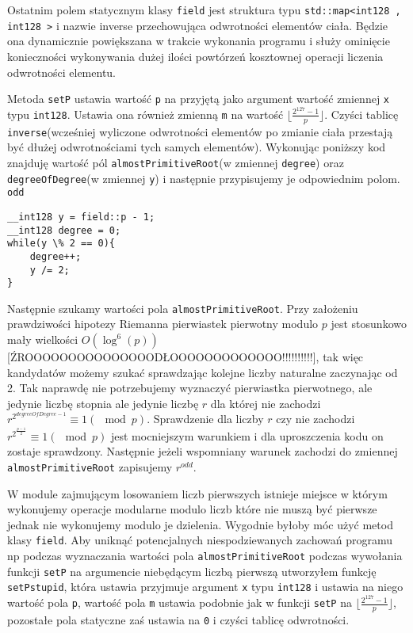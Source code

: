 \documentclass{article}
\begin{document}
Ostatnim polem statycznym klasy \texttt{field} jest struktura typu 
\texttt{std::map<\textunderscore \textunderscore int128 , \textunderscore \textunderscore int128 >} i nazwie 
inverse przechowująca odwrotności elementów ciała. Będzie ona dynamicznie powiększana w trakcie wykonania 
programu i służy ominięcie konieczności wykonywania dużej ilości powtórzeń kosztownej operacji liczenia odwrotności
elementu. 



Metoda \texttt{setP} ustawia wartość
\texttt{p} na przyjętą jako argument wartość zmiennej \texttt{x} typu 
\texttt{\textunderscore \textunderscore int128}. 
Ustawia ona również zmienną \texttt{m} na wartość $\lfloor \frac{2^{127}-1}{p} \rfloor$.
Czyści tablicę \texttt{inverse}(wcześniej wyliczone odwrotności elementów
po zmianie ciała przestają być dłużej odwrotnościami tych samych elementów).
Wykonując poniższy kod znajduję wartość pól \texttt{almostPrimitiveRoot}(w zmiennej \texttt{degree}) oraz 
\texttt{degreeOfDegree}(w zmiennej \texttt{y}) i następnie przypisujemy je odpowiednim polom.
\texttt{odd}
\begin{lstlisting}
__int128 y = field::p - 1;
__int128 degree = 0;
while(y \% 2 == 0){
    degree++;
    y /= 2;
}
\end{lstlisting} 

Następnie szukamy wartości pola \texttt{almostPrimitiveRoot}. 
Przy założeniu prawdziwości hipotezy Riemanna pierwiastek pierwotny modulo $p$ jest
stosunkowo mały wielkości $O(\log^6(p))$ [ŹROOOOOOOOOOOOOOODŁOOOOOOOOOOOOO!!!!!!!!!!], 
tak więc kandydatów możemy szukać sprawdzając kolejne liczby naturalne zaczynając od 2. 
Tak naprawdę nie potrzebujemy wyznaczyć pierwiastka pierwotnego, ale jedynie liczbę stopnia ale jedynie liczbę
$r$ dla której nie zachodzi $r^{2^{degreeOfDegree-1}} \equiv 1 (\mod p)$. Sprawdzenie dla liczby $r$ czy nie zachodzi 
$r^{2^\frac{p-1}{2}} \equiv 1 (\mod p)$ jest mocniejszym warunkiem i dla uproszczenia kodu on zostaje sprawdzony. Następnie
jeżeli wspomniany warunek zachodzi do zmiennej \texttt{almostPrimitiveRoot} zapisujemy $r^{odd}$.

W module zajmującym losowaniem liczb pierwszych istnieje miejsce w którym wykonujemy operacje modularne modulo liczb
które nie muszą być pierwsze jednak nie wykonujemy modulo je dzielenia. Wygodnie byłoby móc użyć metod klasy 
\texttt{field}. Aby uniknąć potencjalnych niespodziewanych zachowań programu np podczas wyznaczania wartości pola 
\texttt{almostPrimitiveRoot} podczas wywołania funkcji \texttt{setP} na 
argumencie niebędącym liczbą pierwszą utworzyłem funkcję \texttt{setPstupid}, która ustawia przyjmuje argument
\texttt{x} typu \texttt{\textunderscore \textunderscore int128} i ustawia na niego wartość
pola \texttt{p}, wartość pola \texttt{m} ustawia podobnie jak w funkcji \texttt{setP} na  
$\lfloor \frac{2^{127}-1}{p} \rfloor$, pozostałe pola statyczne zaś ustawia na \texttt{0} i czyści tablicę odwrotności.
\end{document}

